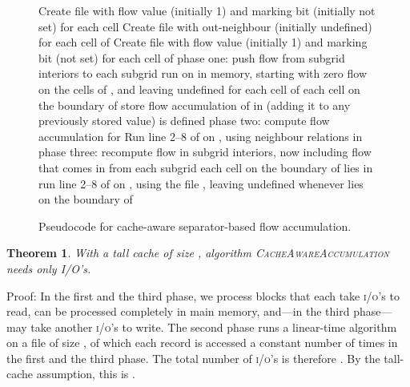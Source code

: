 \documentclass[10pt,a4paper]{article}
\newtheorem{theorem}{Theorem}
\newenvironment{proof}{Proof:}{\qed}
\def\squareforqed{\hbox{\rlap{}}}
\def\qed{\ifmmode\squareforqed\else{\unskip\nobreak\hfil
\penalty50\hskip1em\null\nobreak\hfil\squareforqed
\parfillskip=0pt\finalhyphendemerits=0\endgraf}\fi}
\def\ios{\textsc{i/o}'s\xspace}
\begin{document}
\begin{figure}
\begin{codebox}
\Procname{}
\li Create file  with flow value (initially 1) and marking bit (initially not set) for each cell
\li Create file  with out-neighbour (initially undefined) for each cell of 
\li Create file  with flow value (initially 1) and marking bit (not set) for each cell of 
\li \Comment phase one: push flow from subgrid interiors to 
\li \For each subgrid 
\li \Do  run  on  in memory,
\li      \hbox{}\quad\quad\quad\quad\quad\quad starting with zero flow on the cells of , and
\li      \hbox{}\quad\quad\quad\quad\quad\quad leaving  undefined for each cell of 
\li      \For each cell  on the boundary of 
\li      \Do  store flow accumulation of  in 
\li           \hbox{}\quad\quad\quad\quad\quad\quad (adding it to any previously stored value)
\li           \If  is defined
\li           \Then 
              \End
         \End
    \End
\li \Comment phase two: compute flow accumulation for 
\li Run line 2--8 of  on , using neighbour relations in 
\li \Comment phase three: recompute flow in subgrid interiors, now including flow that comes in from 
\li \For each subgrid 
\li \Do  \For each cell  on the boundary of 
\li      \Do 
\li          \If  lies in 
\li          \Then 
             \End
         \End
\li      run line 2--8 of  on , using the file ,
\li      \hbox{}\quad\quad\quad\quad\quad\quad leaving  undefined whenever  lies on the boundary of 
    \End
\end{codebox}
\caption{Pseudocode for cache-aware separator-based flow accumulation.}
\label{fig:cacheawarecode}
\end{figure}

\begin{theorem}\label{CacheAwareAccumulation}
With a tall cache of size , algorithm \textsc{CacheAwareAccumulation} needs only  I/O's.
\end{theorem}
\begin{proof}
In the first and the third phase, we process  blocks that each take  \ios to read, can be processed completely in main memory, and---in the third phase---may take another  \ios to write. The second phase runs a linear-time algorithm on a file of size , of which each record is accessed a constant number of times in the first and the third phase. The total number of \ios is therefore . By the tall-cache assumption, this is .
\end{proof}
\end{document}
